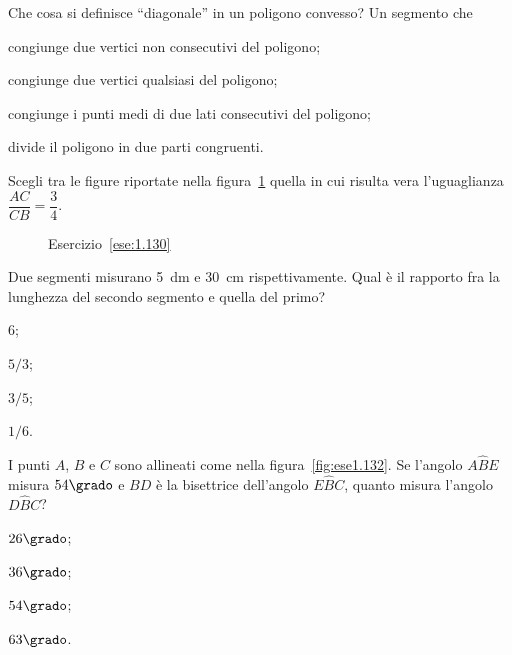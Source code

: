 
\begin{esercizio}
\label{ese:1.129}
Che cosa si definisce ``diagonale'' in un poligono convesso? Un 
segmento che
\begin{enumeratea}
\item congiunge due vertici non consecutivi del poligono;
\item congiunge due vertici qualsiasi del poligono;
\item congiunge i punti medi di due lati consecutivi del poligono;
\item divide il poligono in due parti congruenti.
\end{enumeratea}
\end{esercizio}

	
\begin{esercizio}
\label{ese:1.130}
Scegli tra le figure riportate nella figura~\ref{fig:ese1.130} quella 
in cui risulta vera l'uguaglianza $\dfrac{AC}{CB}=\dfrac{3}{4}$.
\end{esercizio}


\begin{inaccessibleblock}
 \begin{figure}[htb]
 \centering
 \caption{Esercizio~\ref{ese:1.130}}\label{fig:ese1.130}
\end{figure}
\end{inaccessibleblock}

\begin{esercizio}
\label{ese:1.131}
Due segmenti misurano 5~dm e 30~cm rispettivamente. Qual è il 
rapporto fra la lunghezza del secondo segmento e quella del primo?
\begin{multicols}{4}
\begin{enumeratea}
\item 6;
\item $5/3$;
\item $3/5$;
\item $1/6$.
\end{enumeratea}
\end{multicols}
\end{esercizio}

\begin{esercizio}
\label{ese:1.132}
I punti $A$, $B$ e $C$ sono allineati come nella 
figura~\ref{fig:ese1.132}. Se l'angolo $A\widehat{B}E$ misura 
$54\grado$ e $BD$ è la bisettrice dell'angolo $E\widehat{B}C$, quanto 
misura l'angolo $D\widehat{B}C$?
\begin{multicols}{4}
\begin{enumeratea}
\item $26\grado$;
\item $36\grado$;
\item $54\grado$;
\item $63\grado$.
\end{enumeratea}
\end{multicols}
\end{esercizio}


